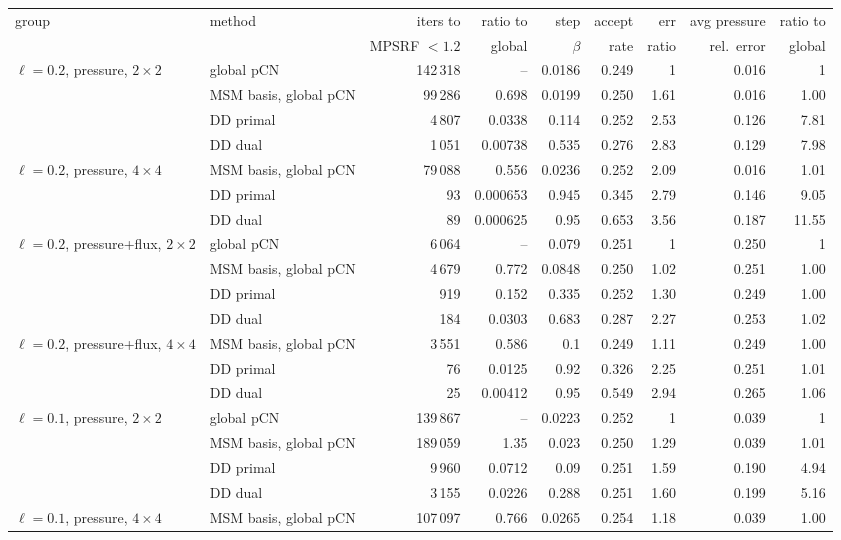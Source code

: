\begin{tabular}{llrrrrrrr}
\toprule
group & method & iters to & ratio to & step & accept & err & avg pressure & ratio to \\
 & & MPSRF $<1.2$ & global & $\beta$ & rate & ratio & rel.\ error & global \\
\midrule
$\ell=0.2$, pressure, $2\times2$ & global pCN & 142\,318 & -- & 0.0186 & 0.249 & 1 & 0.016 & 1 \\
 & MSM basis, global pCN & 99\,286 & 0.698 & 0.0199 & 0.250 & 1.61 & 0.016 & 1.00 \\
 & DD primal & 4\,807 & 0.0338 & 0.114 & 0.252 & 2.53 & 0.126 & 7.81 \\
 & DD dual & 1\,051 & 0.00738 & 0.535 & 0.276 & 2.83 & 0.129 & 7.98 \\
\addlinespace
$\ell=0.2$, pressure, $4\times4$ & MSM basis, global pCN & 79\,088 & 0.556 & 0.0236 & 0.252 & 2.09 & 0.016 & 1.01 \\
 & DD primal & 93 & 0.000653 & 0.945 & 0.345 & 2.79 & 0.146 & 9.05 \\
 & DD dual & 89 & 0.000625 & 0.95 & 0.653 & 3.56 & 0.187 & 11.55 \\
\addlinespace
$\ell=0.2$, pressure+flux, $2\times2$ & global pCN & 6\,064 & -- & 0.079 & 0.251 & 1 & 0.250 & 1 \\
 & MSM basis, global pCN & 4\,679 & 0.772 & 0.0848 & 0.250 & 1.02 & 0.251 & 1.00 \\
 & DD primal & 919 & 0.152 & 0.335 & 0.252 & 1.30 & 0.249 & 1.00 \\
 & DD dual & 184 & 0.0303 & 0.683 & 0.287 & 2.27 & 0.253 & 1.02 \\
\addlinespace
$\ell=0.2$, pressure+flux, $4\times4$ & MSM basis, global pCN & 3\,551 & 0.586 & 0.1 & 0.249 & 1.11 & 0.249 & 1.00 \\
 & DD primal & 76 & 0.0125 & 0.92 & 0.326 & 2.25 & 0.251 & 1.01 \\
 & DD dual & 25 & 0.00412 & 0.95 & 0.549 & 2.94 & 0.265 & 1.06 \\
\addlinespace
$\ell=0.1$, pressure, $2\times2$ & global pCN & 139\,867 & -- & 0.0223 & 0.252 & 1 & 0.039 & 1 \\
 & MSM basis, global pCN & 189\,059 & 1.35 & 0.023 & 0.250 & 1.29 & 0.039 & 1.01 \\
 & DD primal & 9\,960 & 0.0712 & 0.09 & 0.251 & 1.59 & 0.190 & 4.94 \\
 & DD dual & 3\,155 & 0.0226 & 0.288 & 0.251 & 1.60 & 0.199 & 5.16 \\
\addlinespace
$\ell=0.1$, pressure, $4\times4$ & MSM basis, global pCN & 107\,097 & 0.766 & 0.0265 & 0.254 & 1.18 & 0.039 & 1.00 \\

\end{tabular}
